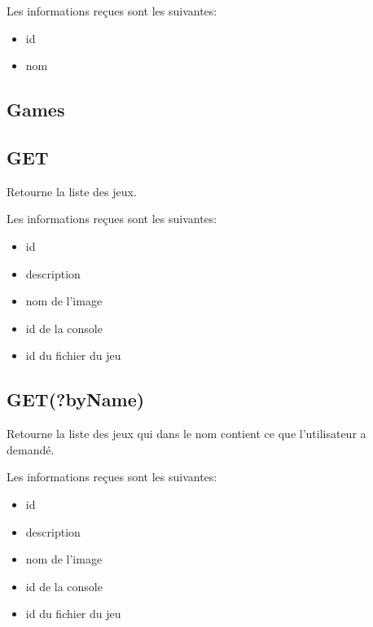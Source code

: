 \documentclass[a4paper,12pt,french]{sphinxmanual}
\begin{document}
\sphinxAtStartPar
Les informations reçues sont les suivantes:
\begin{itemize}
\item {} 
\sphinxAtStartPar
id

\item {} 
\sphinxAtStartPar
nom

\end{itemize}


\subsection{Games}
\label{\detokenize{fonctionnelle:games}}

\subsection{GET}
\label{\detokenize{fonctionnelle:id1}}
\sphinxAtStartPar
Retourne la liste des jeux.

\sphinxAtStartPar
Les informations reçues sont les suivantes:
\begin{itemize}
\item {} 
\sphinxAtStartPar
id

\item {} 
\sphinxAtStartPar
description

\item {} 
\sphinxAtStartPar
nom de l’image

\item {} 
\sphinxAtStartPar
id de la console

\item {} 
\sphinxAtStartPar
id du fichier du jeu

\end{itemize}


\subsection{GET(?byName)}
\label{\detokenize{fonctionnelle:get-byname}}
\sphinxAtStartPar
Retourne la liste des jeux qui dans le nom contient ce que l’utilisateur a demandé.

\sphinxAtStartPar
Les informations reçues sont les suivantes:
\begin{itemize}
\item {} 
\sphinxAtStartPar
id

\item {} 
\sphinxAtStartPar
description

\item {} 
\sphinxAtStartPar
nom de l’image

\item {} 
\sphinxAtStartPar
id de la console

\item {} 
\sphinxAtStartPar
id du fichier du jeu

\end{itemize}
\end{document}
